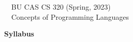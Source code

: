 \documentclass[11pt]{article}
\begin{document}
\begin{flushright}
\begin{minipage}{430pt}
{
\begin{flushleft}
{~~\large\sc BU CAS CS 320 (Spring, 2023)} \\
{~~\LARGE\sc Concepts of Programming Languages}
\end{flushleft}
}
\end{minipage}
\end{flushright}

\vspace{12pt}
\begin{center}
\begin{minipage}{16cm}
\begin{center}
{\LARGE\bf Syllabus} \\[12pt]
\end{center}
\end{minipage}
\end{center}

\thispagestyle{empty}
\end{document}
